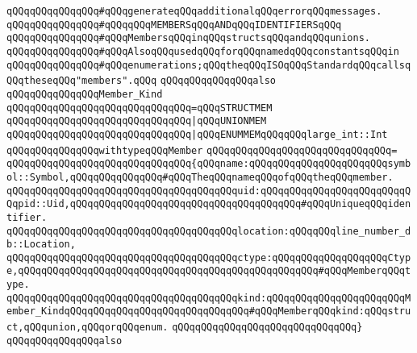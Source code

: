 \verb|qQQqqQQqqQQqqQQq#qQQqgenerateqQQqadditionalqQQqerrorqQQqmessages.|\newline
\newline
\verb|qQQqqQQqqQQqqQQq#qQQqqQQqMEMBERSqQQqANDqQQqIDENTIFIERSqQQq|\newline
\newline
\verb|qQQqqQQqqQQqqQQq#qQQqMembersqQQqinqQQqstructsqQQqandqQQqunions.|\newline
\verb|qQQqqQQqqQQqqQQq#qQQqAlsoqQQqusedqQQqforqQQqnamedqQQqconstantsqQQqin|\newline
\verb|qQQqqQQqqQQqqQQq#qQQqenumerations;qQQqtheqQQqISOqQQqStandardqQQqcallsqQQqtheseqQQq"members".qQQq|\newline
\verb|qQQqqQQqqQQqqQQqalso|\newline
\verb|qQQqqQQqqQQqqQQqMember_Kind|\newline
\verb|qQQqqQQqqQQqqQQqqQQqqQQqqQQqqQQq=qQQqSTRUCTMEM|\newline
\verb|qQQqqQQqqQQqqQQqqQQqqQQqqQQqqQQq|\verb#|qQQqUNIONMEM#\newline
\verb|qQQqqQQqqQQqqQQqqQQqqQQqqQQqqQQq|\verb#|qQQqENUMMEMqQQqqQQqlarge_int::Int#\newline
\newline
\verb|qQQqqQQqqQQqqQQqwithtypeqQQqMember|\newline
\verb|qQQqqQQqqQQqqQQqqQQqqQQqqQQqqQQq=|\newline
\verb|qQQqqQQqqQQqqQQqqQQqqQQqqQQqqQQq{qQQqname:qQQqqQQqqQQqqQQqqQQqqQQqsymbol::Symbol,qQQqqQQqqQQqqQQq#qQQqTheqQQqnameqQQqofqQQqtheqQQqmember.|\newline
\verb|qQQqqQQqqQQqqQQqqQQqqQQqqQQqqQQqqQQqqQQquid:qQQqqQQqqQQqqQQqqQQqqQQqqQQqpid::Uid,qQQqqQQqqQQqqQQqqQQqqQQqqQQqqQQqqQQqqQQq#qQQqUniqueqQQqidentifier.|\newline
\verb|qQQqqQQqqQQqqQQqqQQqqQQqqQQqqQQqqQQqqQQqlocation:qQQqqQQqline_number_db::Location,|\newline
\verb|qQQqqQQqqQQqqQQqqQQqqQQqqQQqqQQqqQQqqQQqctype:qQQqqQQqqQQqqQQqqQQqCtype,qQQqqQQqqQQqqQQqqQQqqQQqqQQqqQQqqQQqqQQqqQQqqQQqqQQq#qQQqMemberqQQqtype.|\newline
\verb|qQQqqQQqqQQqqQQqqQQqqQQqqQQqqQQqqQQqqQQqkind:qQQqqQQqqQQqqQQqqQQqqQQqMember_KindqQQqqQQqqQQqqQQqqQQqqQQqqQQqqQQq#qQQqMemberqQQqkind:qQQqstruct,qQQqunion,qQQqorqQQqenum.|\newline
\verb|qQQqqQQqqQQqqQQqqQQqqQQqqQQqqQQq}|\newline
\newline
\verb|qQQqqQQqqQQqqQQqalso|\newline
